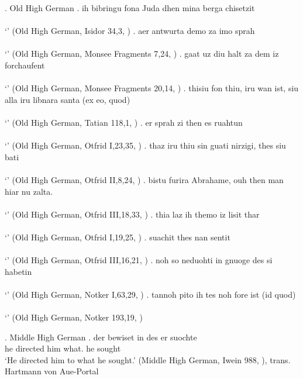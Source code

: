 \ex. Old High German
\ag. ih bibringu fona Juda dhen mina berga chisetzit\\
 \\
 `' \hfill (Old High German, Isidor 34,3, \citealt[761]{behaghel1923})
\bg. aer antwurta demo za imo sprah\\
 \\
 `' \hfill (Old High German, Monsee Fragments 7,24, \citealt[761]{behaghel1923})
\bg. gaat uz diu halt za dem iz forchaufent\\
 \\
 `' \hfill (Old High German, Monsee Fragments 20,14, \citealt[761]{behaghel1923})
\bg. thisiu fon thiu, iru wan ist, siu alla iru libnara santa (ex eo, quod)\\
 \\
 `' \hfill (Old High German, Tatian 118,1, \citealt[761]{behaghel1923})
\bg. er sprah zi then es ruahtun\\
 \\
 `' \hfill (Old High German, Otfrid I,23,35, \citealt[761]{behaghel1923})
\bg. thaz iru thiu sin guati nirzigi, thes siu bati\\
 \\
 `' \hfill (Old High German, Otfrid II,8,24, \citealt[761]{behaghel1923})
\bg. bistu furira Abrahame, ouh then man hiar nu zalta.\\
 \\
 `' \hfill (Old High German, Otfrid III,18,33, \citealt[761]{behaghel1923})
\bg. thia laz ih themo iz lisit thar\\
 \\
 `' \hfill (Old High German, Otfrid I,19,25, \citealt[761]{behaghel1923})
\bg. suachit thes nan sentit\\
 \\
 `' \hfill (Old High German, Otfrid III,16,21, \citealt[761]{behaghel1923})
\bg. noh so neduohti in gnuoge des si habetin\\
 \\
 `' \hfill (Old High German, Notker I,63,29, \citealt[761]{behaghel1923})
\bg. tannoh pito ih tes noh fore ist (id quod)\\
 \\
 `' \hfill (Old High German, Notker 193,19, \citealt[761]{behaghel1923})


\ex. Middle High German
\ag. der bewiset in des er suochte\\
 he directed him {what}. he sought\\
 `He directed him to what he sought.' \hfill (Middle High German, Iwein 988, \citealt[761]{behaghel1923}), trans. Hartmann von Aue-Portal


